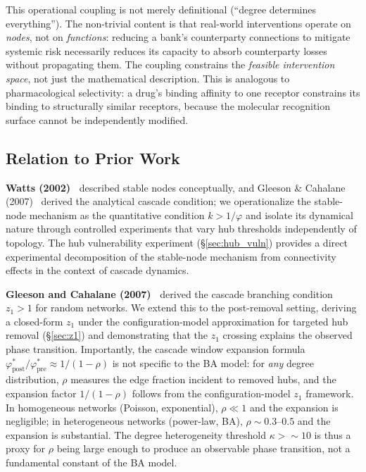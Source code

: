 \documentclass[aps,pre,twocolumn,superscriptaddress,showpacs]{revtex4-2}
\begin{document}
This operational coupling is not merely definitional (``degree determines everything''). The non-trivial content is that real-world interventions operate on \emph{nodes}, not on \emph{functions}: reducing a bank's counterparty connections to mitigate systemic risk necessarily reduces its capacity to absorb counterparty losses without propagating them. The coupling constrains the \emph{feasible intervention space}, not just the mathematical description. This is analogous to pharmacological selectivity: a drug's binding affinity to one receptor constrains its binding to structurally similar receptors, because the molecular recognition surface cannot be independently modified.

\subsection{Relation to Prior Work}

\textbf{Watts (2002)~\cite{Watts2002}} described stable nodes conceptually, and Gleeson \& Cahalane (2007)~\cite{Gleeson2007} derived the analytical cascade condition; we operationalize the stable-node mechanism as the quantitative condition $k > 1/\varphi$ and isolate its dynamical nature through controlled experiments that vary hub thresholds independently of topology. The hub vulnerability experiment (\S\ref{sec:hub_vuln}) provides a direct experimental decomposition of the stable-node mechanism from connectivity effects in the context of cascade dynamics.

\textbf{Gleeson and Cahalane (2007)~\cite{Gleeson2007}} derived the cascade branching condition $z_1 > 1$ for random networks. We extend this to the post-removal setting, deriving a closed-form $z_1$ under the configuration-model approximation for targeted hub removal (\S\ref{sec:z1}) and demonstrating that the $z_1$ crossing explains the observed phase transition. Importantly, the cascade window expansion formula $\varphi^*_{\mathrm{post}}/\varphi^*_{\mathrm{pre}} \approx 1/(1-\rho)$ is not specific to the BA model: for \emph{any} degree distribution, $\rho$ measures the edge fraction incident to removed hubs, and the expansion factor $1/(1-\rho)$ follows from the configuration-model $z_1$ framework. In homogeneous networks (Poisson, exponential), $\rho \ll 1$ and the expansion is negligible; in heterogeneous networks (power-law, BA), $\rho \sim 0.3$--$0.5$ and the expansion is substantial. The degree heterogeneity threshold $\kappa > {\sim}10$ is thus a proxy for $\rho$ being large enough to produce an observable phase transition, not a fundamental constant of the BA model.
\end{document}
